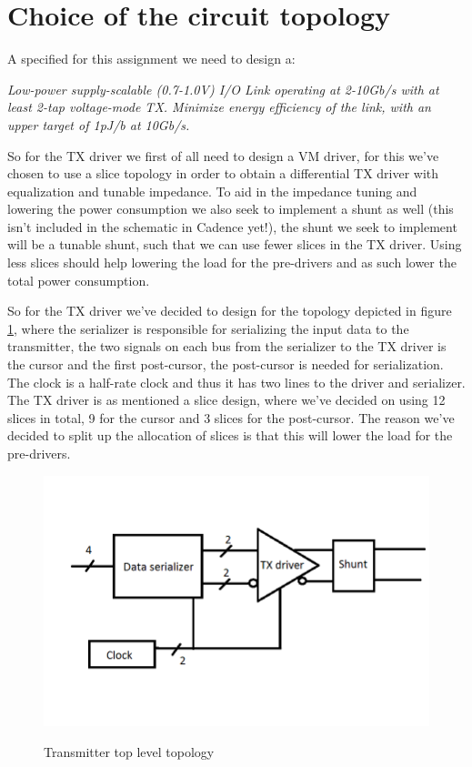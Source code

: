 \section{Choice of the circuit topology}

A specified for this assignment we need to design a:

\textit{Low-power supply-scalable (0.7-1.0V) I/O Link operating at 2-10Gb/s with at
least 2-tap voltage-mode TX. Minimize energy efficiency of the link, with an upper target
of 1pJ/b at 10Gb/s. }

So for the TX driver we first of all need to design a VM driver, for this we've chosen to use a slice topology in order to obtain a differential TX driver with equalization and tunable impedance. To aid in the impedance tuning and lowering the power consumption we also seek to implement a shunt as well (this isn't included in the schematic in Cadence yet!), the shunt we seek to implement will be a tunable shunt, such that we can use fewer slices in the TX driver. Using less slices should help lowering the load for the pre-drivers and as such lower the total power consumption.

So for the TX driver we've decided to design for the topology depicted in figure \ref{fig:topology}, where the serializer is responsible for serializing the input data to the transmitter, the two signals on each bus from the serializer to the TX driver is the cursor and the first post-cursor, the post-cursor is needed for serialization. The clock is a half-rate clock and thus it has two lines to the driver and serializer. The TX driver is as mentioned a slice design, where we've decided on using 12 slices in total, 9 for the cursor and 3 slices for the post-cursor. The reason we've decided to split up the allocation of slices is that this will lower the load for the pre-drivers.

\begin{figure}[H]
  \centering
  {\includegraphics[scale=0.55]{img/Topology.png}}
  \caption{Transmitter top level topology}
  \label{fig:topology}
\end{figure}

